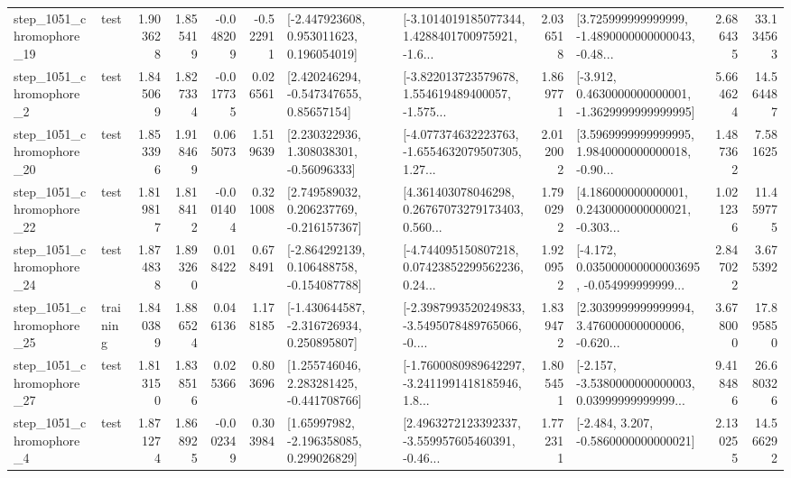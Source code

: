 \begin{tabular}{llrrrrllrlrr}
 step\_1051\_chromophore\_19 &      test &      1.903628 &    1.855419 &     -0.048209 & -0.522911 &    [-2.447923608, 0.953011623, 0.196054019] &  [-3.1014019185077344, 1.4288401700975921, -1.6... &       2.036518 &  [3.725999999999999, -1.4890000000000043, -0.48... &            2.686435 &         33.134563 \\
  step\_1051\_chromophore\_2 &      test &      1.845069 &    1.827334 &     -0.017735 &  0.026561 &     [2.420246294, -0.547347655, 0.85657154] &  [-3.822013723579678, 1.554619489400057, -1.575... &       1.869771 &  [-3.912, 0.4630000000000001, -1.3629999999999995] &            5.664624 &         14.564487 \\
 step\_1051\_chromophore\_20 &      test &      1.853396 &    1.918469 &      0.065073 &  1.519639 &     [2.230322936, 1.308038301, -0.56096333] &  [-4.077374632223763, -1.6554632079507305, 1.27... &       2.012002 &  [3.5969999999999995, 1.9840000000000018, -0.90... &            1.487362 &          7.581625 \\
 step\_1051\_chromophore\_22 &      test &      1.819817 &    1.818412 &     -0.001404 &  0.321008 &    [2.749589032, 0.206237769, -0.216157367] &  [4.361403078046298, 0.26767073279173403, 0.560... &       1.790292 &  [4.186000000000001, 0.2430000000000021, -0.303... &            1.021236 &         11.459775 \\
 step\_1051\_chromophore\_24 &      test &      1.874838 &    1.893260 &      0.018422 &  0.678491 &   [-2.864292139, 0.106488758, -0.154087788] &  [-4.744095150807218, 0.07423852299562236, 0.24... &       1.920952 &  [-4.172, 0.035000000000003695, -0.054999999999... &            2.847022 &          3.675392 \\
 step\_1051\_chromophore\_25 &  training &      1.840389 &    1.886524 &      0.046136 &  1.178185 &   [-1.430644587, -2.316726934, 0.250895807] &  [-2.3987993520249833, -3.5495078489765066, -0.... &       1.839472 &  [2.3039999999999994, 3.476000000000006, -0.620... &            3.678000 &         17.895850 \\
 step\_1051\_chromophore\_27 &      test &      1.813150 &    1.838516 &      0.025366 &  0.803696 &    [1.255746046, 2.283281425, -0.441708766] &  [-1.7600080989642297, -3.2411991418185946, 1.8... &       1.805451 &  [-2.157, -3.5380000000000003, 0.03999999999999... &            9.418486 &         26.680326 \\
  step\_1051\_chromophore\_4 &      test &      1.871274 &    1.868925 &     -0.002349 &  0.303984 &     [1.65997982, -2.196358085, 0.299026829] &  [2.4963272123392337, -3.559957605460391, -0.46... &       1.772311 &               [-2.484, 3.207, -0.5860000000000021] &            2.130255 &         14.566292 \\

\end{tabular}
